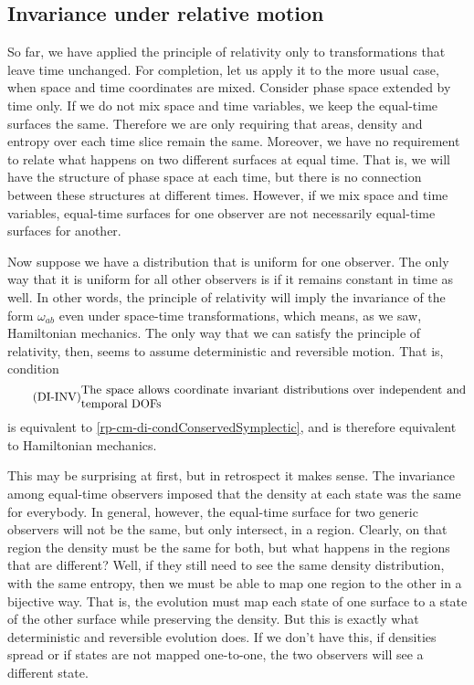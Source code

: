 \subsection{Invariance under relative motion}

So far, we have applied the principle of relativity only to transformations that leave time unchanged. For completion, let us apply it to the more usual case, when space and time coordinates are mixed. Consider phase space extended by time only. If we do not mix space and time variables, we keep the equal-time surfaces the same. Therefore we are only requiring that areas, density and entropy over each time slice remain the same. Moreover, we have no requirement to relate what happens on two different surfaces at equal time. That is, we will have the structure of phase space at each time, but there is no connection between these structures at different times. However, if we mix space and time variables, equal-time surfaces for one observer are not necessarily equal-time surfaces for another.

Now suppose we have a distribution that is uniform for one observer. The only way that it is uniform for all other observers is if it remains constant in time as well. In other words, the principle of relativity will imply the invariance of the form $\omega_{ab}$ even under space-time transformations, which means, as we saw, Hamiltonian mechanics. The only way that we can satisfy the principle of relativity, then, seems to assume deterministic and reversible motion. That is, condition
\begin{equation}\tag{DI-INV}\label{rp-cm-di-condInvariantDensityTime}
	\eqtext{The space allows coordinate invariant distributions over independent and temporal DOFs}
\end{equation}
is equivalent to \ref{rp-cm-di-condConservedSymplectic}, and is therefore equivalent to Hamiltonian mechanics.

This may be surprising at first, but in retrospect it makes sense. The invariance among equal-time observers imposed that the density at each state was the same for everybody. In general, however, the equal-time surface for two generic observers will not be the same, but only intersect, in a region. Clearly, on that region the density must be the same for both, but what happens in the regions that are different? Well, if they still need to see the same density distribution, with the same entropy, then we must be able to map one region to the other in a bijective way. That is, the evolution must map each state of one surface to a state of the other surface while preserving the density. But this is exactly what deterministic and reversible evolution does. If we don't have this, if densities spread or if states are not mapped one-to-one, the two observers will see a different state.

